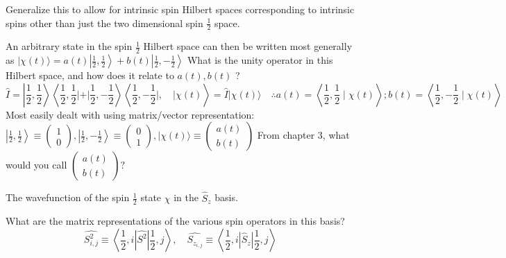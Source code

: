 \documentclass{article}
\begin{document}
Generalize this to allow for intrinsic spin Hilbert spaces corresponding to intrinsic spins other than just the two dimensional spin $\frac{1}{2}$ space.


An arbitrary state in the spin $\frac{1}{2}$ Hilbert space can then be written most generally as $|\chi(t)\rangle=a(t)\left|\frac{1}{2}, \frac{1}{2}\right\rangle+b(t)\left|\frac{1}{2},-\frac{1}{2}\right\rangle$ What is the unity operator in this Hilbert space, and how does it relate to $a(t), b(t)$ ?
$$
\hat{I}=\left|\frac{1}{2}, \frac{1}{2}\right\rangle\left\langle\frac{1}{2}, \frac{1}{2}|+| \frac{1}{2},-\frac{1}{2}\right\rangle\left\langle\frac{1}{2},-\frac{1}{2}|, \quad| \chi(t)\right\rangle=\hat{I}|\chi(t)\rangle \quad \therefore a(t)=\left\langle\frac{1}{2}, \frac{1}{2} \mid \chi(t)\right\rangle ; b(t)=\left\langle\frac{1}{2},-\frac{1}{2} \mid \chi(t)\right\rangle
$$
Most easily dealt with using matrix/vector representation: $\left|\frac{1}{2}, \frac{1}{2}\right\rangle \equiv\left(\begin{array}{l}1 \\ 0\end{array}\right),\left|\frac{1}{2},-\frac{1}{2}\right\rangle \equiv\left(\begin{array}{l}0 \\ 1\end{array}\right),|\chi(t)\rangle \equiv\left(\begin{array}{l}a(t) \\ b(t)\end{array}\right)$ From chapter 3, what would you call $\left(\begin{array}{l}a(t) \\ b(t)\end{array}\right) ?$

The wavefunction of the spin $\frac{1}{2}$ state $\chi$ in the $\hat{S}_z$ basis. 

What are the matrix representations of the various spin operators in this basis?
$$
\widehat{S_{i, j}^{2}} \equiv\left\langle\frac{1}{2}, i\left|\widehat{S^{2}}\right| \frac{1}{2}, j\right\rangle, \quad \widehat{S_{z_{i, j}}} \equiv\left\langle\frac{1}{2}, i\left|\hat{S}_{z}\right| \frac{1}{2}, j\right\rangle
$$
\end{document}
